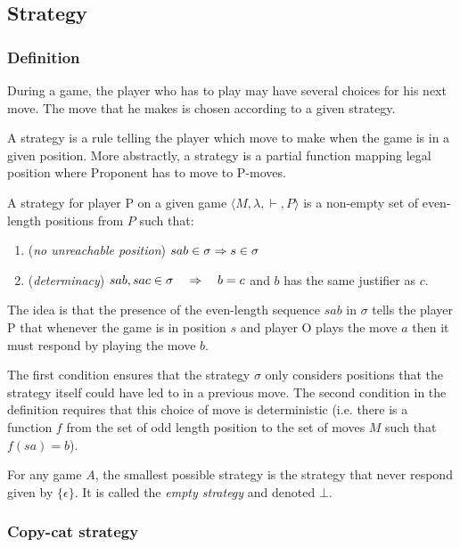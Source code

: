 \subsection{Strategy}

\subsubsection{Definition}

During a game, the player who has to play may have several choices
for his next move. The move that he makes is chosen according to a
given strategy.

A strategy is a rule telling the player which move to make when the
game is in a given position. More abstractly, a strategy is a
partial function mapping legal position where Proponent has to move
to P-moves.

\begin{dfn}[Strategy]
A strategy for player P on a given game $\langle M, \lambda, \vdash, P \rangle$ is a
non-empty set of even-length positions from $P$ such that:
\begin{enumerate}
\item (\emph{no unreachable position}) $sab \in \sigma \Rightarrow s \in \sigma$
\item (\emph{determinacy}) $sab, sac \in \sigma \quad \Rightarrow \quad  b = c$  and $b$ has the same justifier as
$c$.
\end{enumerate}
\end{dfn}

The idea is that the presence of the even-length sequence $s a b$ in
$\sigma$ tells the player P that whenever the game is in position
$s$ and player O plays the move $a$ then it must respond by playing
the move $b$.

The first condition ensures that the strategy $\sigma$ only
considers positions that the strategy itself could have led to in a
previous move. The second condition in the definition requires that
this choice of move is deterministic (i.e. there is a function $f$
from the set of odd length position to the set of moves $M$ such
that $f(s a) = b$).


For any game $A$, the smallest possible strategy is the strategy
that never respond given by $\{ \epsilon \}$. It is called the
\emph{empty strategy} and denoted $\bot$.

\subsubsection{Copy-cat strategy}


